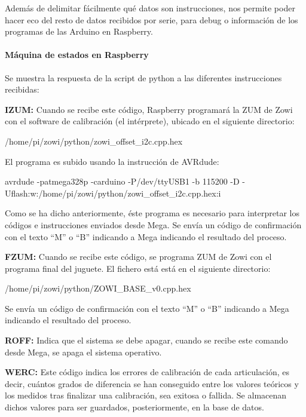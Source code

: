 Además de delimitar fácilmente qué datos son instrucciones, nos permite poder hacer eco del resto de datos recibidos por serie, para debug o información de los programas de las Arduino en Raspberry.

\paragraph{Máquina de estados en Raspberry}

Se muestra la respuesta de la script de python a las diferentes instrucciones recibidas:

\textbf{IZUM:}
Cuando se recibe este código, Raspberry programará la ZUM de Zowi con el software de calibración (el intérprete), ubicado en el siguiente directorio:
\begin{center} /home/pi/zowi/python/zowi\_offset\_i2c.cpp.hex \end{center}

El programa es subido usando la instrucción de AVRdude:
\begin{center} avrdude -patmega328p -carduino -P/dev/ttyUSB1 -b 115200 -D -Uflash:w:/home/pi/zowi/python/zowi\_offset\_i2c.cpp.hex:i \end{center}

Como se ha dicho anteriormente, éste programa es necesario para interpretar los códigos e instrucciones enviados desde Mega. Se envía un código de confirmación con el texto “M” o “B” indicando a Mega indicando el resultado del proceso.

\textbf{FZUM:}
Cuando se recibe este código, se programa ZUM de Zowi con el programa final del juguete. El fichero está está en el siguiente directorio:
\begin{center} /home/pi/zowi/python/ZOWI\_BASE\_v0.cpp.hex \end{center}

Se envía un código de confirmación con el texto “M” o “B” indicando a Mega indicando el resultado del proceso.

\textbf{ROFF:}
Indica que el sistema se debe apagar, cuando se recibe este comando desde Mega, se apaga el sistema operativo.

\textbf{WERC:}
Este código indica los errores de calibración de cada articulación, es decir, cuántos grados de diferencia se han conseguido entre los valores teóricos y los medidos tras finalizar una calibración, sea exitosa o fallida. Se almacenan dichos valores para ser guardados, posteriormente, en la base de datos.

